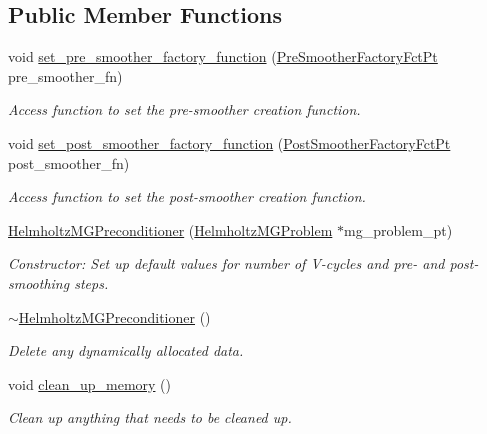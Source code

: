 \subsection*{Public Member Functions}
\begin{DoxyCompactItemize}
\item 
void \hyperlink{classoomph_1_1HelmholtzMGPreconditioner_acb562183934ee547bcd359fb45304522}{set\+\_\+pre\+\_\+smoother\+\_\+factory\+\_\+function} (\hyperlink{classoomph_1_1HelmholtzMGPreconditioner_ac17ab35f36cad29ce8f1e64593c90a95}{Pre\+Smoother\+Factory\+Fct\+Pt} pre\+\_\+smoother\+\_\+fn)
\begin{DoxyCompactList}\small\item\em Access function to set the pre-\/smoother creation function. \end{DoxyCompactList}\item 
void \hyperlink{classoomph_1_1HelmholtzMGPreconditioner_a986dc273c291bcaa9607661f9f3ab06f}{set\+\_\+post\+\_\+smoother\+\_\+factory\+\_\+function} (\hyperlink{classoomph_1_1HelmholtzMGPreconditioner_a3405bc1f75c5e1e83601cd9b0e02634b}{Post\+Smoother\+Factory\+Fct\+Pt} post\+\_\+smoother\+\_\+fn)
\begin{DoxyCompactList}\small\item\em Access function to set the post-\/smoother creation function. \end{DoxyCompactList}\item 
\hyperlink{classoomph_1_1HelmholtzMGPreconditioner_a8a91f0e5891cf326143e83071073e01d}{Helmholtz\+M\+G\+Preconditioner} (\hyperlink{classoomph_1_1HelmholtzMGProblem}{Helmholtz\+M\+G\+Problem} $\ast$mg\+\_\+problem\+\_\+pt)
\begin{DoxyCompactList}\small\item\em Constructor\+: Set up default values for number of V-\/cycles and pre-\/ and post-\/smoothing steps. \end{DoxyCompactList}\item 
\hyperlink{classoomph_1_1HelmholtzMGPreconditioner_adf5e9f25f44d6447c6368da87de8057e}{$\sim$\+Helmholtz\+M\+G\+Preconditioner} ()
\begin{DoxyCompactList}\small\item\em Delete any dynamically allocated data. \end{DoxyCompactList}\item 
void \hyperlink{classoomph_1_1HelmholtzMGPreconditioner_a8ffcf85fcfeac6c4d17c14c6ee35549b}{clean\+\_\+up\+\_\+memory} ()
\begin{DoxyCompactList}\small\item\em Clean up anything that needs to be cleaned up. \end{DoxyCompactList}\item 

\end{DoxyCompactItemize}
